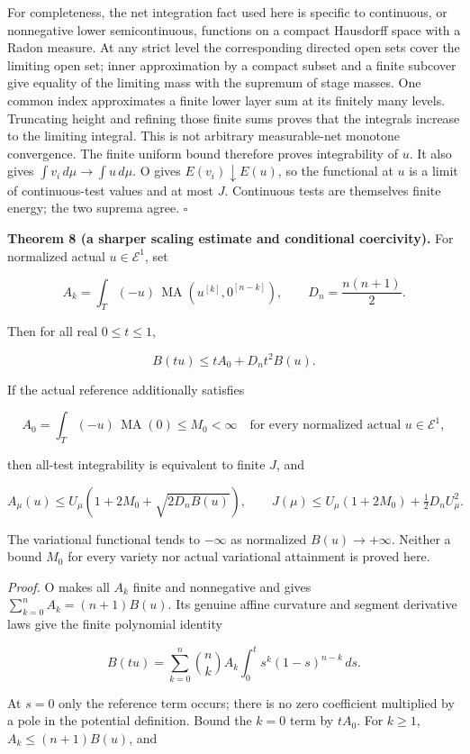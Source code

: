 \documentclass[
  11pt,
]{article}
\begin{document}
For completeness, the net integration fact used here is specific to
continuous, or nonnegative lower semicontinuous, functions on a compact
Hausdorff space with a Radon measure. At any strict level the
corresponding directed open sets cover the limiting open set; inner
approximation by a compact subset and a finite subcover give equality of
the limiting mass with the supremum of stage masses. One common index
approximates a finite lower layer sum at its finitely many levels.
Truncating height and refining those finite sums proves that the
integrals increase to the limiting integral. This is not arbitrary
measurable-net monotone convergence. The finite uniform bound therefore
proves integrability of \(u\). It also gives
\(\int v_i\,d\mu\to\int u\,d\mu\). O gives \(E(v_i)\downarrow E(u)\), so
the functional at \(u\) is a limit of continuous-test values and at most
\(J\). Continuous tests are themselves finite energy; the two suprema
agree. \(\square\)

\textbf{Theorem 8 (a sharper scaling estimate and conditional
coercivity).} For normalized actual \(u\in\mathcal E^1\), set

\[
A_k=\int_T(-u)\,\operatorname{MA}(u^{[k]},0^{[n-k]}),
\qquad D_n=\frac{n(n+1)}2.
\]

Then for all real \(0\leq t\leq1\),

\[
 B(tu)\leq tA_0+D_nt^2B(u).
\]

If the actual reference additionally satisfies

\[
 A_0=\int_T(-u)\,\operatorname{MA}(0)\leq M_0<\infty
\quad\text{for every normalized actual }u\in\mathcal E^1,
\]

then all-test integrability is equivalent to finite \(J\), and

\[
A_\mu(u)\leq U_\mu\left(1+2M_0+\sqrt{2D_nB(u)}\right),
\qquad
J(\mu)\leq U_\mu(1+2M_0)+\tfrac12D_nU_\mu^2.
\]

The variational functional tends to \(-\infty\) as normalized
\(B(u)\to+\infty\). Neither a bound \(M_0\) for every variety nor actual
variational attainment is proved here.

\emph{Proof.} O makes all \(A_k\) finite and nonnegative and gives
\(\sum_{k=0}^nA_k=(n+1)B(u)\). Its genuine affine curvature and segment
derivative laws give the finite polynomial identity

\[
B(tu)=\sum_{k=0}^n\binom nk A_k
 \int_0^t s^k(1-s)^{n-k}\,ds.
\]

At \(s=0\) only the reference term occurs; there is no zero coefficient
multiplied by a pole in the potential definition. Bound the \(k=0\) term
by \(tA_0\). For \(k\geq1\), \(A_k\leq(n+1)B(u)\), and
\end{document}
